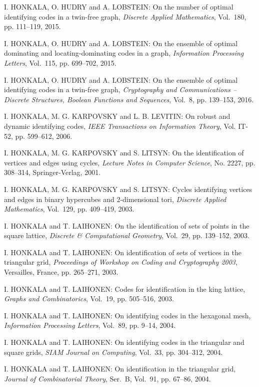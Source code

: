\begin{thebibliography}{999}
 I. HONKALA, O. HUDRY and A. LOBSTEIN: On the number of optimal identifying codes in a twin-free graph, {\it Discrete Applied Mathematics}, Vol.~180, pp. 111--119, 2015.

 I. HONKALA, O. HUDRY and A. LOBSTEIN: On the ensemble of optimal dominating and locating-dominating codes in a graph, {\it Information Processing Letters}, Vol.~115, pp. 699--702, 2015.

 I. HONKALA, O. HUDRY and A. LOBSTEIN: On the ensemble of optimal identifying codes in a twin-free graph, {\it Cryptography and Communications -- Discrete Structures, Boolean Functions and Sequences}, Vol.~8, pp. 139--153, 2016.

I. HONKALA, M. G. KARPOVSKY and L. B. LEVITIN: On robust and dynamic identifying codes, {\it IEEE Transactions on Information Theory}, Vol. IT-52, pp. 599--612, 2006.

I. HONKALA, M. G. KARPOVSKY and S. LITSYN: On the identification of vertices and edges using cycles, {\it Lecture Notes in Computer Science}, No. 2227, pp. 308--314, Springer-Verlag, 2001.

I. HONKALA, M. G. KARPOVSKY and S. LITSYN: Cycles identifying vertices and edges in binary hypercubes and 2-dimensional tori, {\it Discrete Applied Mathematics}, Vol.~129, pp. 409--419, 2003.

I. HONKALA and T. LAIHONEN: On the identification of sets of points in the square lattice, {\it Discrete \& Computational Geometry}, Vol.~29, pp. 139--152, 2003.

I. HONKALA and T. LAIHONEN: On identification of sets of vertices in the triangular grid, {\it Proceedings of Workshop on Coding and Cryptography 2003}, Versailles, France, pp. 265--271, 2003.

I. HONKALA and T. LAIHONEN: Codes for identification in the king lattice, {\it Graphs and Combinatorics}, Vol.~19, pp. 505--516, 2003.

I. HONKALA and T. LAIHONEN: On identifying codes in the hexagonal mesh, {\it Information Processing Letters}, Vol.~89, pp. 9--14, 2004.

I. HONKALA and T. LAIHONEN: On identifying codes in the triangular and square grids, {\it SIAM Journal on Computing}, Vol.~33, pp. 304--312, 2004.

I. HONKALA and T. LAIHONEN: On identification in the triangular grid, {\it Journal of Combinatorial Theory}, Ser.~B, Vol.~91, pp. 67--86, 2004.


\end{thebibliography}
